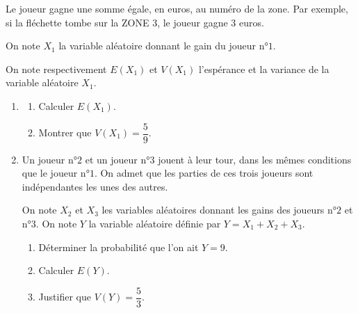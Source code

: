 \documentclass[10pt]{article}
\providecommand{\no}{{\text{n°}}}
\begin{document}
Le joueur gagne une somme égale, en euros, au numéro de la zone. Par exemple, si la fléchette tombe sur la ZONE 3, le joueur gagne 3 euros.

On note $X_{1}$ la variable aléatoire donnant le gain du joueur $\no 1$.

On note respectivement $E(X_{1})$ et $V(X_{1})$ l'espérance et la variance de la variable aléatoire $X_{1}$.

\medskip

\begin{enumerate}
\item 
	\begin{enumerate}
		\item Calculer $E(X_{1})$.
		\item Montrer que $V(X_{1}) = \dfrac{5}{9}$.
	\end{enumerate}
\item  Un joueur $\no 2$ et un joueur $\no 3$ jouent à leur tour, dans les mêmes conditions que le joueur $\no 1$. On admet que les parties de ces trois joueurs sont indépendantes les unes des autres.

On note $X_{2}$ et $X_{3}$ les variables aléatoires donnant les gains des joueurs $\no 2$ et $\no 3$. On note $Y$ la variable aléatoire définie par $Y = X_{1} + X_{2} + X_{3}$.
	\begin{enumerate}
		\item Déterminer la probabilité que l'on ait $Y = 9$.
		\item Calculer $E(Y)$.
		\item Justifier que $V(Y) = \dfrac{5}{3}$.
	\end{enumerate}
\end{enumerate}
\end{document}
